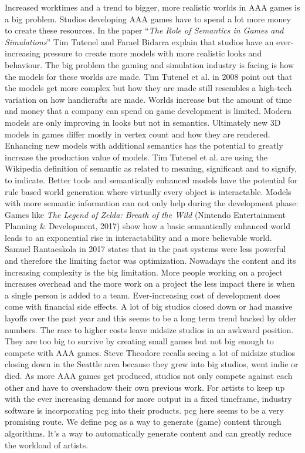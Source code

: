 \documentclass[10pt,a4paper]{article}
\begin{document}
\begin{multicols}{2}
Increased worktimes and a trend to bigger, more realistic worlds in AAA games is a big problem. Studios developing AAA games have to spend a lot more money to create these resources. In the paper “\textit{The Role of Semantics in Games and Simulations}” Tim Tutenel and Farael Bidarra explain that studios have an ever-increasing pressure to create more models with more realistic looks and behaviour. The big problem the gaming and simulation industry is facing is how the models for these worlds are made. Tim Tutenel et al. in 2008 point out that the models get more complex but how they are made still resembles a high-tech variation on how handicrafts are made\cite{Tutenel2008}. Worlds increase but the amount of time and money that a company can spend on game development is limited. Modern models are only improving in looks but not in semantics\cite{Tutenel2008}. Ultimately new 3D models in games differ mostly in vertex count and how they are rendered. Enhancing new models with additional semantics has the potential to greatly increase the production value of models. Tim Tutenel et al. are using the Wikipedia definition of semantic as related to meaning, significant and to signify, to indicate\cite{Wikipediacontributors2019, Tutenel2008}. Better tools and semantically enhanced models have the potential for rule based world generation where virtually every object is interactable. Models with more semantic information can not only help during the development phase: Games like \textit{The Legend of Zelda: Breath of the Wild} (Nintendo Entertainment Planning \& Development, 2017) show how a basic semantically enhanced world leads to an exponential rise in interactability and a more believable world. Samuel Rantaeskola in 2017 states that in the past systems were less powerful and therefore the limiting factor was optimization. Nowadays the content and its increasing complexity is the big limitation\cite{Prinke2017}. More people working on a project increases overhead and the more work on a project the less impact there is when a single person is added to a team.
Ever-increasing cost of development does come with financial side effects. A lot of big studios closed down or had massive layoffs over the past year \cite{Lahti2018, Schreier2019, Walker2019, Schreier2019a} and this seems to be a long term trend backed by older numbers\cite{Plunkett2012}. The race to higher costs leave midsize studios in an awkward position. They are too big to survive by creating small games but not big enough to compete with AAA games. Steve Theodore recalls seeing a lot of midsize studios closing down in the Seattle area because they grew into big studios, went indie or died\cite{Prinke2017}. As more AAA games get produced, studios not only compete against each other and have to overshadow their own previous work. For artists to keep up with the ever increasing demand for more output in a fixed timeframe, industry software is incorporating \gls{pcg} into their products. \gls{pcg} here seems to be a very promising route. We define \gls{pcg} as a way to generate (game) content through algorithms. It’s a way to automatically generate content and can greatly reduce the workload of artists.
\end{multicols}
\end{document}
